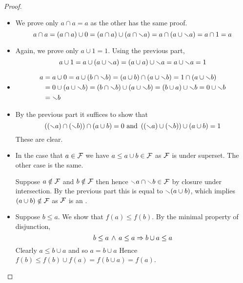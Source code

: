 \begin{proof}~
    \begin{itemize}
        \item We prove only $a \cap a = a$ as the other has the same proof.
            \[a \cap a = (a \cap a) \cup 0 = (a \cap a) \cup (a \cap \smallsetminus a)
            = a \cap (a \cup \smallsetminus a) = a \cap 1 = a\]
        \item Again, we prove only $a \cup 1 = 1$. Using the previous part,
            \[a \cup 1 = a \cup (a \cup \smallsetminus a) = (a \cup a) \cup \smallsetminus a
            = a \cup \smallsetminus a = 1\]
        \item \begin{align*}
            a &= a \cup 0 = a \cup (b \cap \smallsetminus b) = 
            (a \cup b) \cap (a \cup \smallsetminus b) = 1 \cap (a \cup \smallsetminus b)\\
            &= 0 \cup (a \cup \smallsetminus b) = (b \cap \smallsetminus b) \cup (a \cup \smallsetminus b)
            = (b \cup a) \cup \smallsetminus b = 0 \cup \smallsetminus b \\
            &= \smallsetminus b
        \end{align*} 
        \item By the previous part it suffices to show that 
            \[\left((\smallsetminus a) \cap (\smallsetminus b)\right) \cap (a \cup b) = 0 \text{ and }
            \left((\smallsetminus a) \cup (\smallsetminus b) \right) \cup (a \cup b) = 1\]
            These are clear.
        \item \begin{forward}
            In the case that $a \in \mathcal{F}$ we have $a \leq a \cup b \in \mathcal{F}$ 
            as $\mathcal{F}$ is under superset. 
            The other case is the same.
        \end{forward}
        \begin{backward}
            Suppose $a \notin \mathcal{F}$ and $b \notin \mathcal{F}$ then
             hence $\smallsetminus a \cap \smallsetminus b \in \mathcal{F}$
                by closure under intersection. 
                By the previous part this is equal to $\smallsetminus (a \cup b)$,
                which implies $(a \cup b) \notin \mathcal{F}$ as $\mathcal{F}$ 
                is an .
        \end{backward}
        \item Suppose $b \leq a$. 
            We show that $f(a) \leq f(b)$.
            By the minimal property of disjunction,
            \[b \leq a \, \land \, a \leq a \Rightarrow b \cup a \leq a\]
            Clearly $a \leq b \cup a$ and so $a = b \cup a$
            Hence $f(b) \leq f(b) \cup f(a) = f(b \cup a) = f(a)$.

\end{itemize}
\end{proof}
